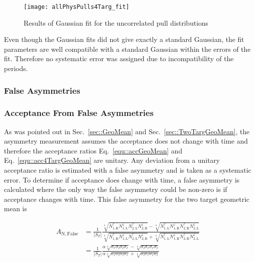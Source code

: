 \begin{figure}[h!t]
  \begin{center}
    \texttt{[image: allPhysPulls4Targ\_fit]}
    \caption{Results of Gaussian fit for the uncorrelated pull distributions}
    \label{fig::allPhysPulls4Targ_fit}
  \end{center}
\end{figure}

Even though the Gaussian fits did not give exactly a standard Gaussian, the fit
parameters are well compatible with a standard Gaussian within the errors of the
fit.  Therefore no systematic error was assigned due to incompatibility of the
periods.

\subsubsection{False Asymmetries}
\subsubsection{Acceptance From False Asymmetries}
As was pointed out in Sec.~\ref{sec::GeoMean} and
Sec.~\ref{sec::TwoTargGeoMean}, the asymmetry measurement assumes the acceptance
does not change with time and therefore the acceptance ratios
Eq.~\ref{equ::accGeoMean} and Eq.~\ref{equ::acc4TargGeoMean} are unitary.  Any
deviation from a unitary acceptance ratio is estimated with a false asymmetry
and is taken as a systematic error.  To determine if acceptance
does change with time, a false asymmetry is calculated where the only way the
false asymmetry could be non-zero is if acceptance changes with time.  This
false asymmetry for the two target geometric mean is

\begin{equation}
  \label{equ::falseAcc}
  \begin{split}
    A_{\mathrm{N,False}} &= 
    \frac{1}{|S_T|}
    \frac{
      \sqrt[4]{
        N_{\mathrm{1,R}}^{\uparrow}N_{\mathrm{1, L}}^{\downarrow}
        N_{\mathrm{2,L}}^{\uparrow}N_{\mathrm{2, R}}^{\downarrow}
      } -
      \sqrt[4]{
        N_{\mathrm{1,L}}^{\uparrow}N_{\mathrm{1, R}}^{\downarrow}
        N_{\mathrm{2,R}}^{\uparrow}N_{\mathrm{2, L}}^{\downarrow}
      }
    }{
      \sqrt[4]{
        N_{\mathrm{1,R}}^{\uparrow}N_{\mathrm{1, L}}^{\downarrow}
        N_{\mathrm{2,L}}^{\uparrow}N_{\mathrm{2, R}}^{\downarrow}
      } +
      \sqrt[4]{
        N_{\mathrm{1,L}}^{\uparrow}N_{\mathrm{1, R}}^{\downarrow}
        N_{\mathrm{2,R}}^{\uparrow}N_{\mathrm{2, L}}^{\downarrow}
      }
    }\\
    & =
    \frac{1}{|S_T|}
    \frac{
      \alpha \sqrt[4]{\sigma_r\sigma_l\sigma_l\sigma_r} -
      \sqrt[4]{\sigma_l\sigma_r\sigma_r\sigma_l}
    }{
      \alpha \sqrt[4]{\sigma_r\sigma_l\sigma_l\sigma_r} +
      \sqrt[4]{\sigma_l\sigma_r\sigma_r\sigma_l}
    }
  \end{split}
\end{equation}

